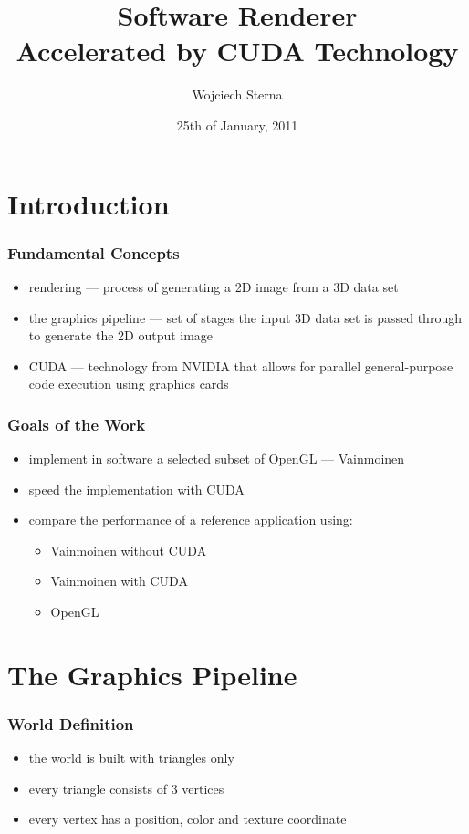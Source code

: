 \documentclass[ignorenonframetext,handout,english]{beamer}
\title{Software Renderer \\Accelerated by CUDA Technology}
\author{Wojciech Sterna}
\date{25th of January, 2011}
\begin{document}
\frame{\titlepage}



\section{Introduction}

\frame
{
	\frametitle{Fundamental Concepts}
	{
		\begin{itemize}
			\pause
			\item rendering --- process of generating a 2D image from a 3D data set
			\pause
			\item the graphics pipeline --- set of stages the input 3D data set is passed through to generate the 2D output image
			\pause
			\item CUDA --- technology from NVIDIA that allows for parallel general-purpose code execution using graphics cards
		\end{itemize}
	}
}

\frame
{
	\frametitle{Goals of the Work}
	{
		\begin{itemize}
			\pause
			\item implement in software a selected subset of OpenGL --- Vainmoinen
			\pause
			\item speed the implementation with CUDA
			\pause
			\item compare the performance of a reference application using:
				\begin{itemize}
					\item Vainmoinen without CUDA
					\item Vainmoinen with CUDA
					\item OpenGL
				\end{itemize}
		\end{itemize}
	}
}



\section{The Graphics Pipeline}

\frame
{
	\frametitle{World Definition}
	{
		\pause

		\begin{itemize}
			\item the world is built with triangles only
			\item every triangle consists of 3 vertices
			\item every vertex has a position, color and texture coordinate
		\end{itemize}
	}
}
\end{document}
